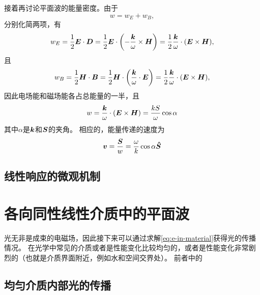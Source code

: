 \documentclass[UTF8, a4paper]{ctexart}
\begin{document}
接着再讨论平面波的能量密度。由于
\[
    w = w_E + w_B,
\]
分别化简两项，有
\[
    w_E = \frac{1}{2} \vb*{E} \cdot \vb*{D} 
        = \frac{1}{2} \vb*{E} \cdot \left( - \frac{\vb*{k}}{\omega} \times \vb*{H} \right) 
        = \frac{1}{2} \frac{\vb*{k}}{\omega} \cdot (\vb*{E} \times \vb*{H}),
\]
且
\[
    w_B = \frac{1}{2} \vb*{H} \cdot \vb*{B} 
        = \frac{1}{2} \vb*{H} \cdot \left( \frac{\vb*{k}}{\omega} \cdot \vb*{E} \right) 
        = \frac{1}{2} \frac{\vb*{k}}{\omega} \cdot (\vb*{E} \times \vb*{H}),
\]
因此电场能和磁场能各占总能量的一半，且
\begin{equation}
    w = \frac{\vb*{k}}{\omega} \cdot (\vb*{E} \times \vb*{H}) = \frac{k S}{\omega} \cos \alpha
    \label{eq:energy-density-and-s}
\end{equation}
其中$\alpha$是$\vb*{k}$和$\vb*{S}$的夹角。
相应的，能量传递的速度为
\begin{equation}
    \vb*{v} = \frac{\vb*{S}}{w} = \frac{\omega}{k}  \cos \alpha \vu*{S}
\end{equation}

\subsection{线性响应的微观机制}


\section{各向同性线性介质中的平面波}\label{sec:light-propagate}

光无非是成束的电磁场，因此接下来可以通过求解\eqref{eq:e-in-material}获得光的传播情况。
在光学中常见的介质或者是性能变化比较均匀的，或者是性能变化非常剧烈的（也就是介质界面附近，例如水和空间交界处）。
前者中的

\subsection{均匀介质内部光的传播}\label{sec:in-interior-uniform}
\end{document}
